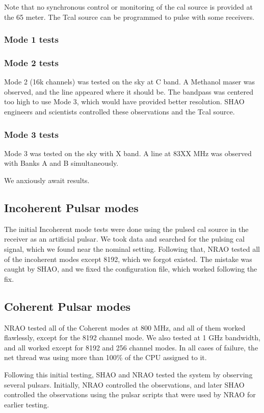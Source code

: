 \documentclass[11pt]{article}
\begin{document}
Note that no synchronous control or monitoring of the cal source is
provided at the 65 meter.  The Tcal source can be programmed to pulse
with some receivers.
\subsubsection{Mode 1 tests}

\subsubsection{Mode 2 tests}
Mode 2 (16k channels) was tested on the sky at C band.  A Methanol
maser was observed, and the line appeared where it should be.  The
bandpass was centered too high to use Mode 3, which would have
provided better resolution.  SHAO engineers and scientists controlled
these observations and the Tcal source.

\subsubsection{Mode 3 tests}
Mode 3 was tested on the sky with X band.  A line at 83XX MHz was
observed with Banks A and B simultaneously.

We anxiously await results.

\subsection{Incoherent Pulsar modes}
The initial Incoherent mode tests were done using the pulsed cal
source in the receiver as an artificial pulsar.  We took data and
searched for the pulsing cal signal, which we found near the nominal
setting.  Following that, NRAO tested all of the incoherent modes
except 8192, which we forgot existed.  The mistake was caught by SHAO,
and we fixed the configuration file, which worked following the fix.

\subsection{Coherent Pulsar modes}
NRAO tested all of the Coherent modes at 800 MHz, and all of them
worked flawlessly, except for the 8192 channel mode.  We also tested
at 1 GHz bandwidth, and all worked except for 8192 and 256 channel
modes.  In all cases of failure, the net thread was using more than
100\% of the CPU assigned to it.

Following this initial testing, SHAO and NRAO tested the system by
observing several pulsars.  Initially, NRAO controlled the
observations, and later SHAO controlled the observations using the
pulsar scripts that were used by NRAO for earlier testing.
\end{document}
